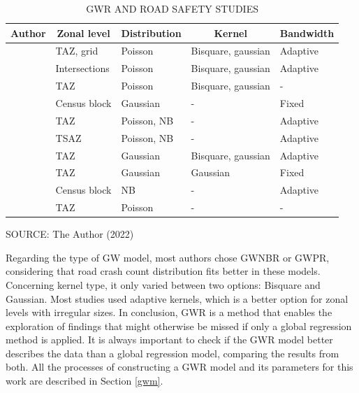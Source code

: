 \begin{table}[!htbp]
    \footnotesize
    \captionsetup{justification=raggedright,
        singlelinecheck=false,
        font=footnotesize}
    \caption{GWR AND ROAD SAFETY STUDIES}
    \centering
    \begin{tabular}{lllp{1.6cm}l}
        \hline
        \multicolumn{1}{c}{\textbf{Author}} & \multicolumn{1}{c}{\textbf{Zonal level}} & \multicolumn{1}{c}{\textbf{Distribution}} & \multicolumn{1}{c}{\textbf{Kernel}} & \multicolumn{1}{c}{\textbf{Bandwidth}} \\
        \hline 
        \textcite{Amoh-Gyimah2017} & TAZ, grid & Poisson & Bisquare, gaussian & Adaptive \\
        \textcite{Arvin2019} & Intersections & Poisson & Bisquare, gaussian & Adaptive \\
        \textcite{Hadayeghi2010} & TAZ & Poisson & Bisquare, gaussian & - \\
        \textcite{Huang2018} & Census block & Gaussian & - & Fixed \\
        \textcite{Obelheiro2019} & TAZ & Poisson, NB & - & Adaptive \\
        \textcite{Obelheiro2020} & TSAZ & Poisson, NB & - & Adaptive \\
        \textcite{Pirdavani2014} & TAZ & Gaussian & Bisquare, gaussian & Adaptive \\
        \textcite{Rhee2016} & TAZ & Gaussian & Gaussian & Fixed \\
        \textcite{Yu2017} & Census block & NB & - & Adaptive \\
        \textcite{Zhang2015} & TAZ & Poisson & - & - \\
        \hline
    \end{tabular}
    \label{tab:gwrworks}
    \par \vspace{2mm} \footnotesize \raggedright
    SOURCE: The Author (2022)
\end{table}

Regarding the type of GW model, most authors chose GWNBR or GWPR, considering that road crash count distribution fits better in these models. Concerning kernel type, it only varied between two options: Bisquare and Gaussian. Most studies used adaptive kernels, which is a better option for zonal levels with irregular sizes. In conclusion, GWR is a method that enables the exploration of findings that might otherwise be missed if only a global regression method is applied. It is always important to check if the GWR model better describes the data than a global regression model, comparing the results from both. All the processes of constructing a GWR model and its parameters for this work are described in Section \ref{gwm}.


